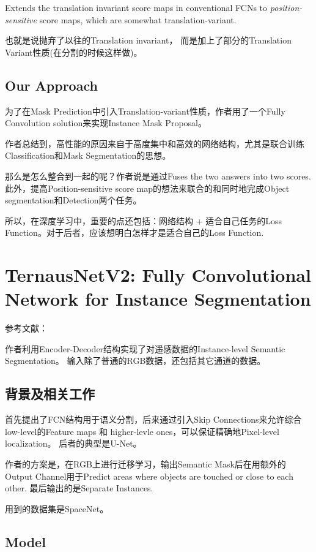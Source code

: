 Extends the translation invariant score maps in conventional FCNs to \textit{position-sensitive} score maps, which are somewhat translation-variant.

也就是说抛弃了以往的Translation invariant， 而是加上了部分的Translation Variant性质(在分割的时候这样做)。

\subsection{Our Approach}

为了在Mask Prediction中引入Translation-variant性质，作者用了一个Fully Convolution solution来实现Instance Mask Proposal。

作者总结到，高性能的原因来自于高度集中和高效的网络结构，尤其是联合训练Classification和Mask Segmentation的思想。

那么是怎么整合到一起的呢？作者说是通过Fuses the two answers into two scores. 此外，提高Position-sensitive score map的想法来联合的和同时地完成Object segmentation和Detection两个任务。

所以，在深度学习中，重要的点还包括：网络结构 + 适合自己任务的Loss Function。对于后者，应该想明白怎样才是适合自己的Loss Function.

\section{TernausNetV2: Fully Convolutional Network for Instance Segmentation}

参考文献：\cite{iglovikov2018ternausnetv2}

作者利用Encoder-Decoder结构实现了对遥感数据的Instance-level Semantic Segmentation。 输入除了普通的RGB数据，还包括其它通道的数据。

\subsection{背景及相关工作}

首先提出了FCN结构用于语义分割，后来通过引入Skip Connections来允许综合low-level的Feature maps 和 higher-levle ones，可以保证精确地Pixel-level localization。 后者的典型是U-Net。

作者的方案是，在RGB上进行迁移学习，输出Semantic Mask后在用额外的Output Channel用于Predict areas where objects are touched or close to each other. 最后输出的是Separate Instances.

用到的数据集是SpaceNet。

\subsection{Model}

